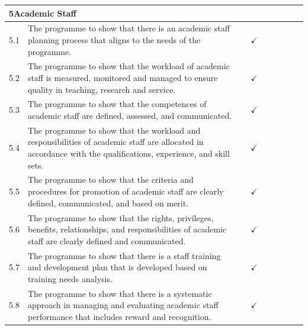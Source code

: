 \begin{longtable}{|p{0.6cm}|>{\raggedright\arraybackslash}p{9.2cm}|c|c|c|c|c|c|c|}
  \multicolumn{9}{|l|}{\cellcolor{gray!15}\textbf{5\quad Academic Staff}} \\
  \hline
  5.1 & The programme to show that there is an academic staff planning process that aligns to the needs of the programme. & & $\checkmark$ & & & & & \\
  \hline
  5.2 & The programme to show that the workload of academic staff is measured, monitored and managed to ensure quality in teaching, research and service. & & $\checkmark$ & & & & & \\
  \hline
  5.3 & The programme to show that the competences of academic staff are defined, assessed, and communicated. & & $\checkmark$ & & & & & \\
  \hline
  5.4 & The programme to show that the workload and responsibilities of academic staff are allocated in accordance with the qualifications, experience, and skill sets. & & $\checkmark$ & & & & & \\
  \hline
  5.5 & The programme to show that the criteria and procedures for promotion of academic staff are clearly defined, communicated, and based on merit. & & $\checkmark$ & & & & & \\
  \hline
  5.6 & The programme to show that the rights, privileges, benefits, relationships, and responsibilities of academic staff are clearly defined and communicated. & & $\checkmark$ & & & & & \\
  \hline
  5.7 & The programme to show that there is a staff training and development plan that is developed based on training needs analysis. & & $\checkmark$ & & & & & \\
  \hline
  5.8 & The programme to show that there is a systematic approach in managing and evaluating academic staff performance that includes reward and recognition. & & $\checkmark$ & & & & & \\
  \hline


\end{longtable}
